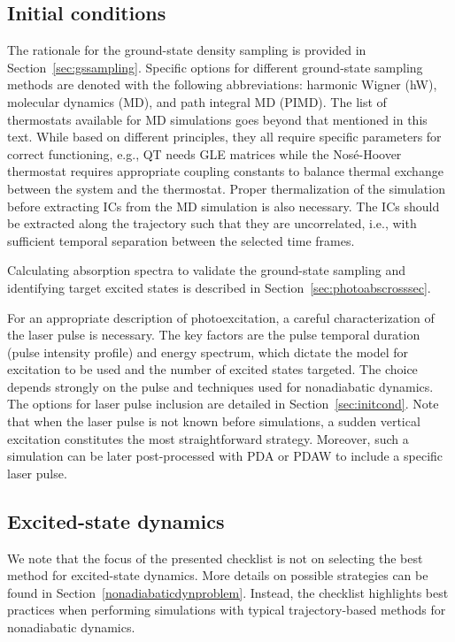 \documentclass[9pt,bestpractices,pubversion]{livecoms}
\begin{document}
\subsection{Initial conditions}

The rationale for the ground-state density sampling is provided in Section~\ref{sec:gssampling}. Specific options for different ground-state sampling methods are denoted with the following abbreviations: harmonic Wigner (hW), molecular dynamics (MD), and path integral MD (PIMD). 
The list of thermostats available for MD simulations goes beyond that mentioned in this text. While based on different principles, they all require specific parameters for correct functioning, e.g., QT needs GLE matrices while the Nosé-Hoover thermostat requires appropriate coupling constants to balance thermal exchange between the system and the thermostat. Proper thermalization of the simulation before extracting ICs from the MD simulation is also necessary. The ICs should be extracted along the trajectory such that they are uncorrelated, i.e., with sufficient temporal separation between the selected time frames. 

Calculating absorption spectra to validate the ground-state sampling and identifying target excited states is described in Section~\ref{sec:photoabscrosssec}.

For an appropriate description of photoexcitation, a careful characterization of the laser pulse is necessary. The key factors are the pulse temporal duration (pulse intensity profile) and energy spectrum, which dictate the model for excitation to be used and the number of excited states targeted. The choice depends strongly on the pulse and techniques used for nonadiabatic dynamics. The options for laser pulse inclusion are detailed in Section~\ref{sec:initcond}. Note that when the laser pulse is not known before simulations, a sudden vertical excitation constitutes the most straightforward strategy. Moreover, such a simulation can be later post-processed with PDA or PDAW to include a specific laser pulse.

\subsection{Excited-state dynamics}
We note that the focus of the presented checklist is not on selecting the best method for excited-state dynamics. More details on possible strategies can be found in Section~\ref{nonadiabaticdynproblem}. Instead, the checklist highlights best practices when performing simulations with typical trajectory-based methods for nonadiabatic dynamics.
\end{document}
